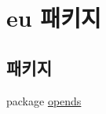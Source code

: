 \hypertarget{namespaceeu}{}\section{eu 패키지}
\label{namespaceeu}
\subsection*{패키지}
\begin{DoxyCompactItemize}
\item 
package \hyperlink{namespaceeu_1_1opends}{opends}
\end{DoxyCompactItemize}
